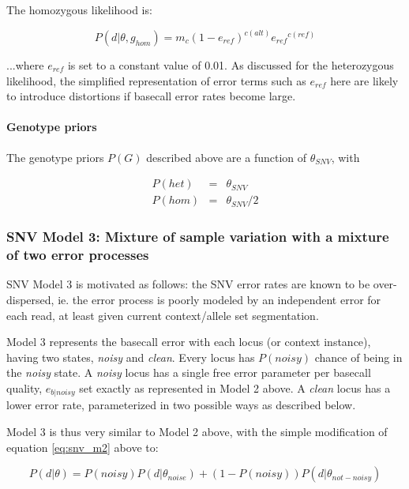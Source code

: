 \documentclass{article}
\begin{document}
The homozygous likelihood is:

\begin{equation*}
P (d \vert \theta, g_{hom}) = m_c (1-e_{ref})^{c(alt)} {e_{ref}}^{c(ref)}
\end{equation*}

...where $e_{ref}$ is set to a constant value of 0.01. As discussed for the heterozygous likelihood, the simplified representation of error terms such as $e_{ref}$ here are likely to introduce distortions if basecall error rates become large.


\paragraph{Genotype priors}

The genotype priors $P(G)$ described above are a function of $\theta_{SNV}$, with

\begin{eqnarray*}
	P(het) &=& \theta_{SNV} \\
	P(hom) &=& \theta_{SNV} / 2
\end{eqnarray*}


\subsubsection{SNV Model 3: Mixture of sample variation with a mixture of two error processes}

SNV Model 3 is motivated as follows: the SNV error rates are known to be over-dispersed, ie. the error process is poorly modeled by an independent error for each read, at least given current context/allele set segmentation.

Model 3 represents the basecall error with each locus (or context instance), having two states, \emph{noisy} and \emph{clean}. Every locus has $P(noisy)$ chance of being in the \emph{noisy} state. A \emph{noisy} locus has a single free error parameter per basecall quality, $e_{b|noisy}$ set exactly as represented in Model 2 above. A \emph{clean} locus has a lower error rate, parameterized in two possible ways as described below.

Model 3 is thus very similar to Model 2 above, with the simple modification of equation \ref{eq:snv_m2} above to:

\begin{equation*}
P(d \vert \theta) = P(noisy) P (d \vert \theta_{noise}) + (1-P(noisy)) P (d \vert \theta_{not-noisy})
\end{equation*}
\end{document}
